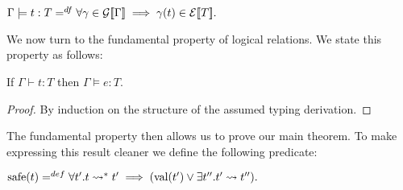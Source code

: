 \begin{center}
  \begin{math}
    \Gamma \models t : T =^{df} \forall \gamma \in \mathcal{G}[\negthinspace[\Gamma]\negthinspace] \implies
    \gamma(t) \in \mathcal{E}[\negthinspace[T]\negthinspace].
  \end{math}
\end{center}
\noindent
We now turn to the fundamental property of logical relations.  We state this property as
follows:
\vspace{-17px}
\begin{lemma}
  \label{lemma:fundamental_property}
  If $\Gamma \vdash t : T$ then $\Gamma \models e : T$.
\end{lemma}
\begin{proof}
  By induction on the structure of the assumed typing derivation.
\end{proof}
\noindent
The fundamental property then allows us to prove our main theorem.  To make
expressing this result cleaner we define the following predicate:
\begin{center}
  \begin{math}
    \text{safe}(t) =^{def} \forall t'.t \rightsquigarrow^* t' \implies (\text{val}(t') \lor \exists t''.t' \rightsquigarrow t'').
  \end{math}
\end{center}


